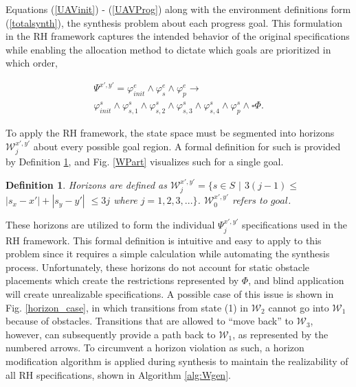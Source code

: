 \documentclass{ieeeaccess}
\newcommand{\always}{\square}
\newtheorem{definition}{Definition}
\begin{document}
Equations (\ref{UAVinit}) - (\ref{UAVProg}) along with the environment definitions form (\ref{totalsynth}), the synthesis problem about each progress goal. This formulation in the RH framework captures the intended behavior of the original specifications while enabling the allocation method to dictate which goals are prioritized in which order,

\begin{equation}
\label{totalsynth}
\begin{aligned}
\Psi^{x',y'} = \varphi^e_{init} \land \varphi^e_s \land \varphi^e_p \longrightarrow \\ \varphi^s_{init} \land \varphi^s_{s,1} \land \varphi^s_{s,2} \land \varphi^s_{s,3} \land \varphi^s_{s,4} \land \varphi^s_p \land \always \Phi.
\end{aligned}
\end{equation}

To apply the RH framework, the state space must be segmented into horizons $\mathcal{W}_j^{x',y'}$ about every possible goal region. A formal definition for such is provided by Definition \ref{definition6}, and Fig. \ref{WPart} visualizes such for a single goal.

\begin{definition}
	\label{definition6}
	Horizons are defined as $\mathcal{W}^{x',y'}_j = \{s \in S$ $|$ $3(j-1)\le$ $|s_x - x'| + |s_y - y'|$ $ \le 3j$ where $j = 1, 2, 3,...\}$. $\mathcal{W}^{x',y'}_0$ refers to $goal$.
\end{definition}

These horizons are utilized to form the individual $\Psi^{x',y'}_j$ specifications used in the RH framework. This formal definition is intuitive and easy to apply to this problem since it requires a simple calculation while automating the synthesis process. Unfortunately, these horizons do not account for static obstacle placements which create the restrictions represented by $\Phi$, and blind application will create unrealizable specifications.  A possible case of this issue is shown in Fig. \ref{horizon_case}, in which transitions from state (1) in $\mathcal{W}_2$ cannot go into $\mathcal{W}_1$ because of obstacles. Transitions that are allowed to ``move back'' to $\mathcal{W}_3$, however, can subsequently provide a path back to $\mathcal{W}_1$, as represented by the numbered arrows. To circumvent a horizon violation as such, a horizon modification algorithm is applied during synthesis to maintain the realizability of all RH specifications, shown in Algorithm \ref{alg:Wgen}.
\end{document}
